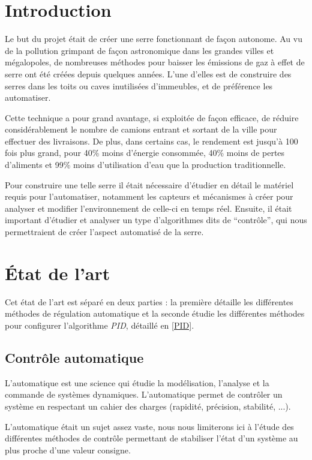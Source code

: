 \documentclass[a4paper,10pt]{report}
\begin{document}
\tableofcontents

\chapter{Introduction}

Le but du projet était de créer une serre fonctionnant de façon autonome. Au vu de la pollution grimpant de façon astronomique dans les grandes villes et mégalopoles, de nombreuses méthodes pour baisser les émissions de gaz à effet de serre ont été créées depuis quelques années. L'une d'elles est de construire des serres dans les toits ou caves inutilisées d'immeubles, et de préférence les automatiser.

Cette technique a pour grand avantage, si exploitée de façon efficace, de réduire considérablement le nombre de camions entrant et sortant de la ville pour effectuer des livraisons. De plus, dans certains cas, le rendement est jusqu'à 100 fois plus grand, pour 40\% moins d'énergie consommée, 40\% moins de pertes d'aliments et 99\% moins d'utilisation d'eau que la production traditionnelle. \cite{GEReports}

Pour construire une telle serre il était nécessaire d'étudier en détail le matériel requis pour l'automatiser, notamment les capteurs et mécanismes à créer pour analyser et modifier l'environnement de celle-ci en temps réel.
Ensuite, il était important d'étudier et analyser un type d'algorithmes dits de ``contrôle'', qui nous permettraient de créer l'aspect automatisé de la serre.


\chapter{État de l'art}

Cet état de l'art est séparé en deux parties : la première détaille les différentes méthodes de régulation automatique et la seconde étudie les différentes méthodes pour configurer l'algorithme \emph{PID}, détaillé en \ref{PID}.

\section{Contrôle automatique}
L’automatique est une science qui étudie la modélisation, l’analyse et la commande de systèmes dynamiques.
L’automatique permet de contrôler un système en respectant un cahier des charges (rapidité, précision, stabilité, ...).

L'automatique était un sujet assez vaste, nous nous limiterons ici à l'étude des différentes méthodes de contrôle permettant de stabiliser l'état d'un système au plus proche d'une valeur consigne.
\end{document}

